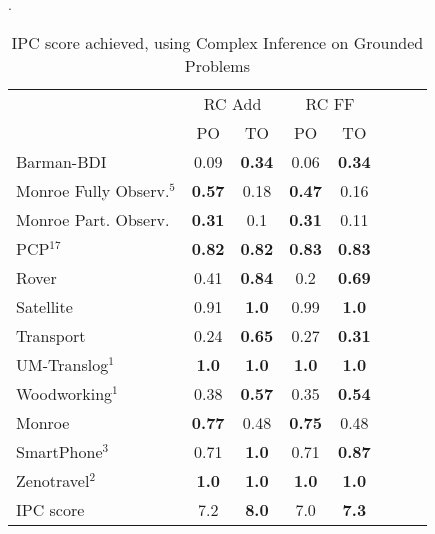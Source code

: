 \begin{table}
	\centering
	\caption{IPC score achieved, using Complex Inference on Grounded Problems}
	\label{table:GroundedComplexIPC}.
	\scalebox{0.8} {
\begin{tabular}{lccccccl}
			\toprule
		& \multicolumn{2}{c}{ RC Add} & \multicolumn{2}{c}{ RC FF} \\ %
		\cmidrule(lr){2-3} \cmidrule(lr){4-5}
	&PO & TO  &PO & TO  \\
	\midrule
	Barman-BDI & 0.09 & \textbf{0.34} & 0.06 & \textbf{0.34}  \\

	Monroe Fully Observ.$^{5}$ & \textbf{0.57} & 0.18 & \textbf{0.47} & 0.16  \\
	Monroe Part. Observ. & \textbf{0.31} & 0.1 & \textbf{0.31} & 0.11  \\
	PCP$^{17}$ & \textbf{0.82} & \textbf{0.82} & \textbf{0.83} & \textbf{0.83}  \\
	Rover & 0.41 & \textbf{0.84} & 0.2 & \textbf{0.69}  \\
	Satellite & 0.91 & \textbf{1.0} & 0.99 & \textbf{1.0}  \\
	Transport & 0.24 & \textbf{0.65} & 0.27 & \textbf{0.31}  \\
	UM-Translog$^{1}$ & \textbf{1.0} & \textbf{1.0} & \textbf{1.0} & \textbf{1.0}  \\
	Woodworking$^{1}$ & 0.38 & \textbf{0.57} & 0.35 & \textbf{0.54}  \\
	\midrule
	Monroe & \textbf{0.77} & 0.48 & \textbf{0.75} & 0.48  \\
	SmartPhone$^{3}$ & 0.71 & \textbf{1.0} & 0.71 & \textbf{0.87}  \\
	Zenotravel$^{2}$ & \textbf{1.0} & \textbf{1.0} & \textbf{1.0} & \textbf{1.0}  \\
		\midrule
	IPC score & 7.2 & \textbf{8.0} & 7.0 & \textbf{7.3}  \\
	\bottomrule
\end{tabular}
	}
\end{table}
